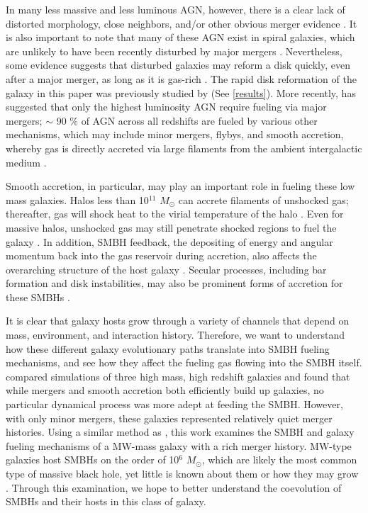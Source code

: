 \documentclass[]{emulateapj}
\begin{document}
In many less massive and less luminous AGN, however, there is a clear lack of distorted morphology, close neighbors, and/or other obvious merger evidence \citep{Ryan2007,Schawinski2011,Ellison2013,Hicks2013}. It is also important to note that many of these AGN exist in spiral galaxies, which are unlikely to have been recently disturbed by major mergers \citep{Schawinski2011,Kocevski2011}. Nevertheless, some evidence suggests that disturbed galaxies may reform a disk quickly, even after a major merger, as long as it is gas-rich \citep{vanGorkom1997}. The rapid disk reformation of the galaxy in this paper was previously studied by \cite{Governato2009} (See \ref{results}). More recently, \cite{Treister2012} has suggested that only the highest luminosity AGN require fueling via major mergers; $\sim$ 90 $\%$ of AGN across all redshifts are fueled by various other mechanisms, which may include minor mergers, flybys, and smooth accretion, whereby gas is directly accreted via large filaments from the ambient intergalactic medium \citep{Cox2006,Bellovary2013,Sinha2012,Dubois2012,DiMatteo2016}.

Smooth accretion, in particular, may play an important role in fueling these low mass galaxies. Halos less than 10$^{11}$ $M_{\odot}$ can accrete filaments of unshocked gas; thereafter, gas will shock heat to the virial temperature of the halo \citep{Keres2005}. Even for massive halos, unshocked gas may still penetrate shocked regions to fuel the galaxy \citep{Brooks2009,Dekel2009,Nelson2013}. In addition, SMBH feedback, the depositing of energy and angular momentum back into the gas reservoir during accretion, also affects the overarching structure of the host galaxy \citep{Governato2009a}. Secular processes, including bar formation and disk instabilities, may also be prominent forms of accretion for these SMBHs \citep{Athanassoula2016,Kormendy2013}. 

It is clear that galaxy hosts grow through a variety of channels that depend on mass, environment, and interaction history. Therefore, we want to understand how these different galaxy evolutionary paths translate into SMBH fueling mechanisms, and see how they affect the fueling gas flowing into the SMBH itself. \cite{Bellovary2013} compared simulations of three high mass, high redshift galaxies and found that while mergers and smooth accretion both efficiently build up galaxies, no particular dynamical process was more adept at feeding the SMBH. However, with only minor mergers, these galaxies represented relatively quiet merger histories. Using a similar method as \cite{Bellovary2013}, this work examines the SMBH and galaxy fueling mechanisms of a MW-mass galaxy with a rich merger history. MW-type galaxies host SMBHs on the order of 10$^6$ $M_{\odot}$, which are likely the most common type of massive black hole, yet little is known about them or how they may grow \citep{Kormendy2013}. Through this examination, we hope to better understand the coevolution of SMBHs and their hosts in this class of galaxy. 
\end{document}
